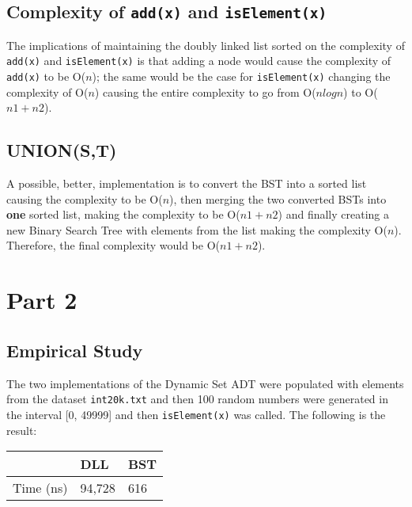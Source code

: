\documentclass{article}
\newcommand{\code}[1]{\texttt{#1}}
\begin{document}
\restoregeometry


\newpage

\subsection{Complexity of \code{add(x)} and \code{isElement(x)}}
The implications of maintaining the doubly linked list sorted on the complexity of \code{add(x)} and \code{isElement(x)} is that adding a node would cause the complexity of \code{add(x)} to be O($n$); the same would be the case for \code{isElement(x)} changing the complexity of O($n$) causing the entire complexity to go from O($n logn$) to O($n1+n2$).

\bigskip

\subsection{UNION(S,T)}
A possible, better, implementation is to convert the BST into a sorted list causing the complexity to be O($n$), then merging the two converted BSTs into \textbf{one} sorted list, making the complexity to be O($n1+n2$) and finally creating a new Binary Search Tree with elements from the list making the complexity O($n$). Therefore, the final complexity would be O($n1+n2$).


\section{Part 2}

\bigskip

\subsection{Empirical Study}
The two implementations of the Dynamic Set ADT were populated with elements from the dataset \code{int20k.txt} and then 100 random numbers were generated in the interval [0, 49999] and then \code{isElement(x)} was called. The following is the result:

\smallskip

\begin{table}[H]
\centering
\begin{tabular}{|l|l|l|}
\hline
            & DLL    & BST \\ \hline
 Time (ns)  & 94,728 & 616 \\ \hline
\end{tabular}
\end{table}
\end{document}
